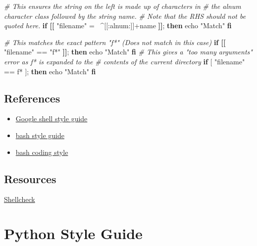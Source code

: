 \documentclass[
]{book}
\newenvironment{Shaded}{\begin{snugshade}}{\end{snugshade}}
\newcommand{\BuiltInTok}[1]{#1}
\newcommand{\CommentTok}[1]{\textcolor[rgb]{0.56,0.35,0.01}{\textit{#1}}}
\newcommand{\KeywordTok}[1]{\textcolor[rgb]{0.13,0.29,0.53}{\textbf{#1}}}
\newcommand{\NormalTok}[1]{#1}
\newcommand{\OtherTok}[1]{\textcolor[rgb]{0.56,0.35,0.01}{#1}}
\newcommand{\StringTok}[1]{\textcolor[rgb]{0.31,0.60,0.02}{#1}}
\providecommand{\tightlist}{%
  \setlength{\itemsep}{0pt}\setlength{\parskip}{0pt}}
\begin{document}
\begin{Shaded}
\begin{Highlighting}[]
\CommentTok{# This ensures the string on the left is made up of characters in}
\CommentTok{# the alnum character class followed by the string name.}
\CommentTok{# Note that the RHS should not be quoted here.}
\KeywordTok{if [[} \StringTok{"filename"}\NormalTok{ =~ ^[[:alnum:]]+name}\KeywordTok{ ]]}\NormalTok{; }\KeywordTok{then}
  \BuiltInTok{echo} \StringTok{"Match"}
\KeywordTok{fi}

\CommentTok{# This matches the exact pattern "f*" (Does not match in this case)}
\KeywordTok{if [[} \StringTok{"filename"} \OtherTok{==} \StringTok{"f*"}\KeywordTok{ ]]}\NormalTok{; }\KeywordTok{then}
  \BuiltInTok{echo} \StringTok{"Match"}
\KeywordTok{fi}
\CommentTok{# This gives a "too many arguments" error as f* is expanded to the}
\CommentTok{# contents of the current directory}
\KeywordTok{if}\BuiltInTok{ [} \StringTok{"filename"} \OtherTok{==}\NormalTok{ f*}\BuiltInTok{ ]}\NormalTok{; }\KeywordTok{then}
  \BuiltInTok{echo} \StringTok{"Match"}
\KeywordTok{fi}
\end{Highlighting}
\end{Shaded}

\hypertarget{references}{%
\section{References}\label{references}}

\begin{itemize}
\tightlist
\item
  \href{https://google.github.io/styleguide/shellguide.html}{Google shell style guide}
\item
  \href{https://github.com/bahamas10/bash-style-guide}{bash style guide}
\item
  \href{https://github.com/icy/bash-coding-style}{bash coding style}
\end{itemize}

\hypertarget{resources}{%
\section{Resources}\label{resources}}

\href{https://github.com/koalaman/shellcheck}{Shellcheck}

\hypertarget{python-style-guide}{%
\chapter{Python Style Guide}\label{python-style-guide}}
\end{document}
